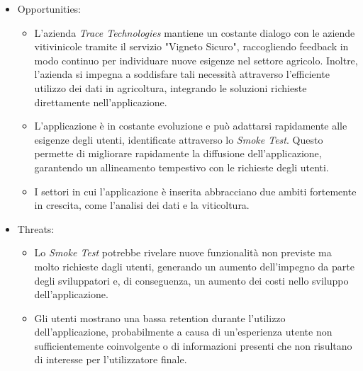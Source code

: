 \begin{itemize}
\begin{itemize}
	\end{itemize}
	\item Opportunities:
	\begin{itemize}
		\item L'azienda \textit{Trace Technologies} mantiene un costante dialogo con le aziende vitivinicole tramite il servizio "Vigneto Sicuro", raccogliendo feedback in modo continuo per individuare nuove esigenze nel settore agricolo. Inoltre, l'azienda si impegna a soddisfare tali necessità attraverso l'efficiente utilizzo dei dati in agricoltura, integrando le soluzioni richieste direttamente nell'applicazione.
		\item L'applicazione è in costante evoluzione e può adattarsi rapidamente alle esigenze degli utenti, identificate attraverso lo \textit{Smoke Test}. Questo permette di migliorare rapidamente la diffusione dell'applicazione, garantendo un allineamento tempestivo con le richieste degli utenti.	
		\item I settori in cui l'applicazione è inserita abbracciano due ambiti fortemente in crescita, come l'analisi dei dati e la viticoltura.
	\end{itemize}
	\item Threats:
	\begin{itemize}
		\item Lo \textit{Smoke Test} potrebbe rivelare nuove funzionalità non previste ma molto richieste dagli utenti, generando un aumento dell'impegno da parte degli sviluppatori e, di conseguenza, un aumento dei costi nello sviluppo dell'applicazione.
		\item Gli utenti mostrano una bassa retention durante l'utilizzo dell'applicazione, probabilmente a causa di un'esperienza utente non sufficientemente coinvolgente o di informazioni presenti che non risultano di interesse per l'utilizzatore finale.
	\end{itemize}
\end{itemize}